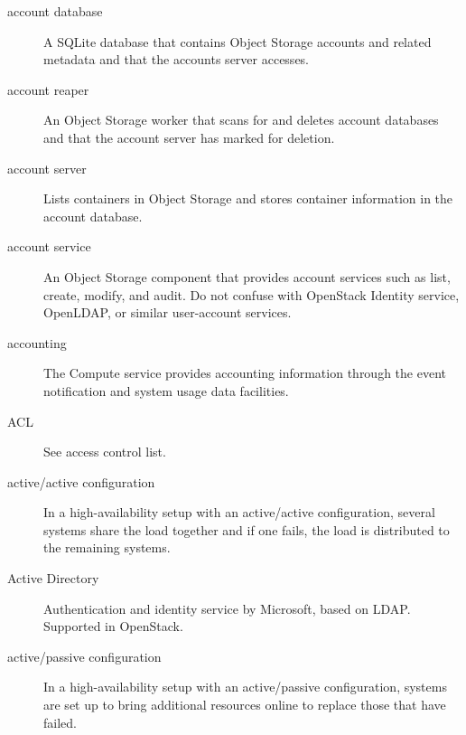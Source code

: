 \documentclass[letterpaper,10pt,english]{sphinxmanual}
\begin{document}
\begin{description}
\item[{account database}] \leavevmode{}\label{_source/glossary:term-account-database}
A SQLite database that contains Object Storage accounts and
related metadata and that the accounts server accesses.

\item[{account reaper}] \leavevmode{}\label{_source/glossary:term-account-reaper}
An Object Storage worker that scans for and deletes account
databases and that the account server has marked for deletion.

\item[{account server}] \leavevmode{}\label{_source/glossary:term-account-server}
Lists containers in Object Storage and stores container
information in the account database.

\item[{account service}] \leavevmode{}\label{_source/glossary:term-account-service}
An Object Storage component that provides account services such
as list, create, modify, and audit. Do not confuse with OpenStack
Identity service, OpenLDAP, or similar user-account services.

\item[{accounting}] \leavevmode{}\label{_source/glossary:term-accounting}
The Compute service provides accounting information through the
event notification and system usage data facilities.

\item[{ACL}] \leavevmode{}\label{_source/glossary:term-acl}
See access control list.

\item[{active/active configuration}] \leavevmode{}\label{_source/glossary:term-active-active-configuration}
In a high-availability setup with an active/active
configuration, several systems share the load together and if one
fails, the load is distributed to the remaining systems.

\item[{Active Directory}] \leavevmode{}\label{_source/glossary:term-active-directory}
Authentication and identity service by Microsoft, based on LDAP.
Supported in OpenStack.

\item[{active/passive configuration}] \leavevmode{}\label{_source/glossary:term-active-passive-configuration}
In a high-availability setup with an active/passive
configuration, systems are set up to bring additional resources online
to replace those that have failed.


\end{description}
\end{document}
